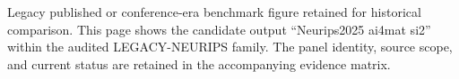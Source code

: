 Legacy published or conference-era benchmark figure retained for historical comparison. This page shows the candidate output ``Neurips2025 ai4mat si2'' within the audited LEGACY-NEURIPS family. The panel identity, source scope, and current status are retained in the accompanying evidence matrix.
